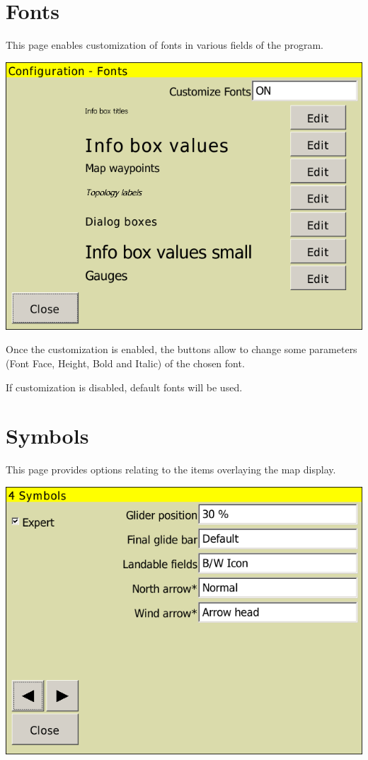 \clearpage
\section{Fonts}

This page enables customization of fonts in various fields of the program.

\begin{center}
\includegraphics[angle=0,width=0.8\linewidth,keepaspectratio='true']{figures/config-fonts.png}
\end{center}

Once the customization is enabled, the  buttons allow to change some parameters (Font 
Face, Height, Bold and Italic) of the chosen font.

If customization is disabled, default fonts will be used.

\clearpage
\section{Symbols}\label{sec:symbols}

This page provides options relating to the items overlaying the map display.

\begin{center}
\includegraphics[angle=0,width=0.8\linewidth,keepaspectratio='true']{figures/config-symbols.png}
\end{center}

